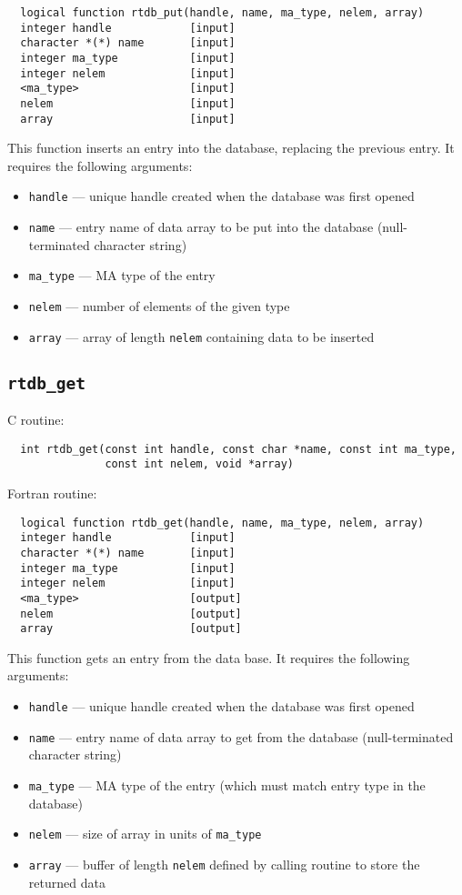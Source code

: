 \begin{verbatim}
  logical function rtdb_put(handle, name, ma_type, nelem, array)
  integer handle            [input]
  character *(*) name       [input]
  integer ma_type           [input]
  integer nelem             [input]
  <ma_type>                 [input]
  nelem                     [input]
  array                     [input]
\end{verbatim}
This function inserts an entry into the database, replacing the previous entry.
It requires the following arguments:
\begin{itemize}
\item {\tt handle} --- unique handle created when the database was first opened
\item {\tt name} --- entry name of data array to be put into the database (null-terminated character string)
\item {\tt ma\_type} --- MA type of the entry
\item {\tt nelem} --- number of elements of the given type
\item {\tt array} --- array of length {\tt nelem} containing data to be inserted
\end{itemize}

\subsection{{\tt rtdb\_get}}

C routine:

\begin{verbatim}
  int rtdb_get(const int handle, const char *name, const int ma_type,
               const int nelem, void *array)
\end{verbatim}


Fortran routine:

\begin{verbatim}
  logical function rtdb_get(handle, name, ma_type, nelem, array)
  integer handle            [input]
  character *(*) name       [input]
  integer ma_type           [input]
  integer nelem             [input]
  <ma_type>                 [output]
  nelem                     [output]
  array                     [output]
\end{verbatim}
This function gets an entry from the data base. It requires the following arguments:
\begin{itemize}
\item {\tt handle} --- unique handle created when the database was first opened
\item {\tt name} --- entry name of data array to get from the database (null-terminated character string)
\item {\tt ma\_type} --- MA type of the entry (which must match entry type in the database)
\item {\tt nelem} --- size of array in units of {\tt ma\_type}
\item {\tt array} --- buffer of length {\tt nelem} defined by calling routine to store the returned data
\end{itemize}

